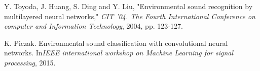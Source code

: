 \documentclass[final]{beamer}
\begin{document}
\begin{frame}[t]
\begin{multicols}{3}
\begin{thebibliography}{99}
 Y. Toyoda, J. Huang, S. Ding and Y. Liu, "Environmental sound recognition by multilayered neural networks," \textit{CIT '04. The Fourth International Conference on computer and Information Technology}, 2004, pp. 123-127.

 K. Piczak. Environmental sound classification with convolutional neural networks. In\textit{IEEE international workshop on Machine Learning for signal processing}, 2015.

\end{thebibliography}

\end{multicols}

\end{frame}
\end{document}
